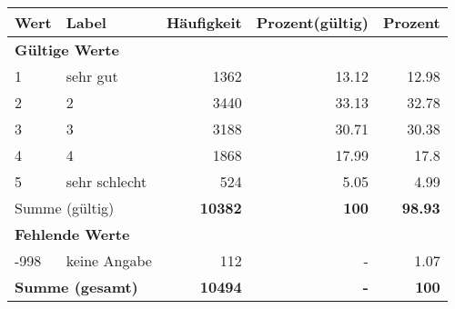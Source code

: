      \begin{longtable}{lXrrr}
     \toprule
     \textbf{Wert} & \textbf{Label} & \textbf{Häufigkeit} & \textbf{Prozent(gültig)} & \textbf{Prozent} \\
     \endhead
     \midrule
     \multicolumn{5}{l}{\textbf{Gültige Werte}}\\

     1 &
     \multicolumn{1}{X}{ sehr gut   } &


       \num{1362} &
       \num[round-mode=places,round-precision=2]{13.12} &
         \num[round-mode=places,round-precision=2]{12.98} \\

     2 &
     \multicolumn{1}{X}{ 2   } &


       \num{3440} &
       \num[round-mode=places,round-precision=2]{33.13} &
         \num[round-mode=places,round-precision=2]{32.78} \\

     3 &
     \multicolumn{1}{X}{ 3   } &


       \num{3188} &
       \num[round-mode=places,round-precision=2]{30.71} &
         \num[round-mode=places,round-precision=2]{30.38} \\

     4 &
     \multicolumn{1}{X}{ 4   } &


       \num{1868} &
       \num[round-mode=places,round-precision=2]{17.99} &
         \num[round-mode=places,round-precision=2]{17.8} \\

     5 &
     \multicolumn{1}{X}{ sehr schlecht   } &


       \num{524} &
       \num[round-mode=places,round-precision=2]{5.05} &
         \num[round-mode=places,round-precision=2]{4.99} \\
     \midrule
     \multicolumn{2}{l}{Summe (gültig)} &
       \textbf{\num{10382}} &
     \textbf{\num{100}} &
       \textbf{\num[round-mode=places,round-precision=2]{98.93}} \\
     \multicolumn{5}{l}{\textbf{Fehlende Werte}}\\
       -998 &
       keine Angabe &
         \num{112} &
        - &
         \num[round-mode=places,round-precision=2]{1.07} \\
     \midrule
     \multicolumn{2}{l}{\textbf{Summe (gesamt)}} &
          \textbf{\num{10494}} &
        \textbf{-} &
        \textbf{\num{100}} \\
     \bottomrule
     \end{longtable}
     
